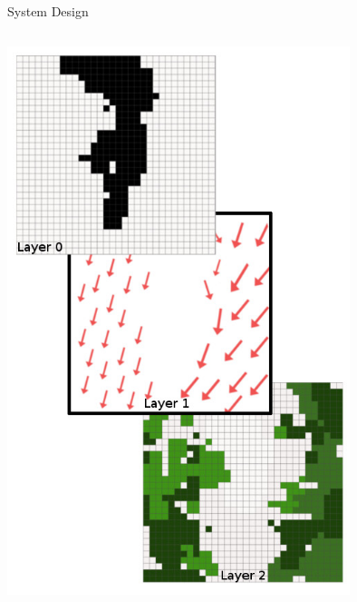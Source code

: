 \documentclass[9pt]{beamer}
\begin{document}
\begin{frame}{System Design}
\begin{columns}
\begin{column}{0.5\textwidth}
\begin{center}
                \includegraphics[width=0.75\textwidth,trim={0cm 0cm 0cm 0cm},clip]{img/layers.jpg}
            \end{center}
        \end{column}
    \end{columns}
\end{frame}
\end{document}
